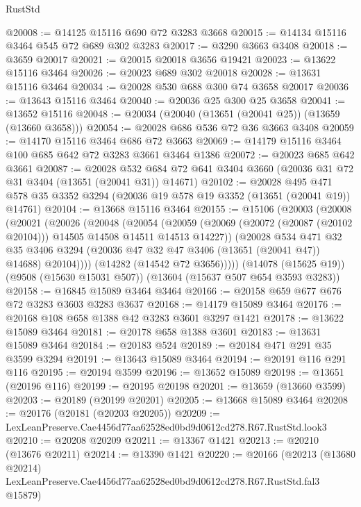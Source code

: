 \begin{lexlean}{RustStd}
\begin{coremodule}
@20008 := @14125 @15116 @690 @72 @3283 @3668
@20015 := @14134 @15116 @3464 @545 @72 @689 @302 @3283
@20017 := @3290 @3663 @3408
@20018 := @3659 @20017
@20021 := @20015 @20018 @3656 @19421
@20023 := @13622 @15116 @3464
@20026 := @20023 @689 @302 @20018
@20028 := @13631 @15116 @3464
@20034 := @20028 @530 @688 @300 @74 @3658 @20017
@20036 := @13643 @15116 @3464
@20040 := @20036 @25 @300 @25 @3658
@20041 := @13652 @15116
@20048 := @20034 (@20040 (@13651 (@20041 @25)) (@13659 (@13660 @3658)))
@20054 := @20028 @686 @536 @72 @36 @3663 @3408
@20059 := @14170 @15116 @3464 @686 @72 @3663
@20069 := @14179 @15116 @3464 @100 @685 @642 @72 @3283 @3661 @3464 @1386
@20072 := @20023 @685 @642 @3661
@20087 := @20028
    @532
    @684
    @72
    @641
    @3404
    @3660
    (@20036 @31 @72 @31 @3404 (@13651 (@20041 @31)) @14671)
@20102 := @20028
    @495
    @471
    @578
    @35
    @3352
    @3294
    (@20036 @19 @578 @19 @3352 (@13651 (@20041 @19)) @14761)
@20104 := @13668 @15116 @3464
@20155 := @15106
    (@20003
      (@20008
        (@20021
          (@20026
            (@20048
              (@20054
                (@20059
                  (@20069 (@20072 (@20087 (@20102 @20104))) @14505 @14508 @14511 @14513 @14227))
                (@20028
                  @534
                  @471
                  @32
                  @35
                  @3406
                  @3294
                  (@20036 @47 @32 @47 @3406 (@13651 (@20041 @47)) @14688)
                  @20104))))
          (@14282 (@14542 @72 @3656)))))
    (@14078 (@15625 @19))
    (@9508 (@15630 @15031 @507))
    (@13604 (@15637 @507 @654 @3593 @3283))
@20158 := @16845 @15089 @3464 @3464
@20166 := @20158 @659 @677 @676 @72 @3283 @3603 @3283 @3637
@20168 := @14179 @15089 @3464
@20176 := @20168 @108 @658 @1388 @42 @3283 @3601 @3297 @1421
@20178 := @13622 @15089 @3464
@20181 := @20178 @658 @1388 @3601
@20183 := @13631 @15089 @3464
@20184 := @20183 @524
@20189 := @20184 @471 @291 @35 @3599 @3294
@20191 := @13643 @15089 @3464
@20194 := @20191 @116 @291 @116
@20195 := @20194 @3599
@20196 := @13652 @15089
@20198 := @13651 (@20196 @116)
@20199 := @20195 @20198
@20201 := @13659 (@13660 @3599)
@20203 := @20189 (@20199 @20201)
@20205 := @13668 @15089 @3464
@20208 := @20176 (@20181 (@20203 @20205))
@20209 := LexLeanPreserve.Cae4456d77aa62528ed0bd9d0612cd278.R67.RustStd.look3
@20210 := @20208 @20209
@20211 := @13367 @1421
@20213 := @20210 (@13676 @20211)
@20214 := @13390 @1421
@20220 := @20166
    (@20213
      (@13680 @20214)
      LexLeanPreserve.Cae4456d77aa62528ed0bd9d0612cd278.R67.RustStd.fal3
      @15879)

\end{coremodule}
\end{lexlean}
